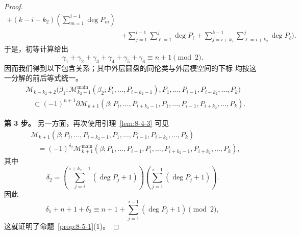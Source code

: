 \begin{proof}
\[\begin{aligned}
 +(k-i-k_2)\left(\sum_{m=1}^{i-1}\deg P_m\right)\\
 &+\sum_{j=1}^{i-1}\sum_{\ell=1}^{j}\deg P_\ell
 +\sum_{j=i+k_2}^{k-1}\sum_{\ell=i+k_2}^{j}\deg P_\ell
 \Bigg).
\end{aligned}
\]
于是，初等计算给出
\[
 \gamma_1+\gamma_2+\gamma_3+\gamma_4+\gamma_5+\gamma_6
 \equiv n+1\pmod2.
\]
因而我们得到以下包含关系；其中外层圆盘的同伦类与外层模空间的下标
均按这一分解的前后等式统一。%
\[
\begin{aligned}
 &\mathcal M_{k-k_2+2}
 \bigl(\beta_1;
 \mathcal M_{k_2+1}^{\mathrm{main}}
 (\beta_2;P_i,\ldots,P_{i+k_2-1}),
 P_1,\ldots,P_{i-1},P_{i+k_2},\ldots,P_k\bigr)\\
 &\quad\subset
 (-1)^{n+1}\partial\mathcal M_{k+1}
 (\beta;P_i,\ldots,P_{i+k_2-1},P_1,\ldots,
 P_{i-1},P_{i+k_2},\ldots,P_k).
\end{aligned}
\]

\par\smallskip\noindent\textbf{第 3 步。}
另一方面，再次使用引理~\ref{lem:8-4-3} 可见
\[
\begin{aligned}
 &\mathcal M_{k+1}
 (\beta;P_i,\ldots,P_{i+k_2-1},P_1,\ldots,
 P_{i-1},P_{i+k_2},\ldots,P_k)\\
 &\quad={}
 (-1)^{\delta_2}\mathcal M_{k+1}^{\mathrm{main}}
 (\beta;P_1,\ldots,P_{i-1},P_i,\ldots,
 P_{i+k_2-1},P_{i+k_2},\ldots,P_k),
\end{aligned}
\]
其中
\[
 \delta_2=\left(\sum_{j=i}^{i+k_2-1}(\deg P_j+1)\right)
 \left(\sum_{j=1}^{i-1}(\deg P_j+1)\right).
\]
因此
\[
 \delta_1+n+1+\delta_2
 \equiv n+1+\sum_{j=1}^{i-1}(\deg P_j+1)\pmod2,
\]
这就证明了命题~\ref{prop:8-5-1}(1)。


\end{proof}
